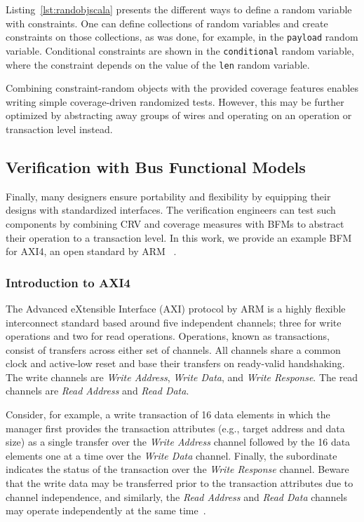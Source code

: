 \documentclass[conference]{IEEEtran}
\begin{document}
Listing~\ref{lst:randobjscala} presents the different ways to define a random variable with constraints.
One can define collections of random variables and create constraints on those collections, as was done, for example, in the \texttt{payload} random variable. 
Conditional constraints are shown in the \texttt{conditional} random variable, where the constraint depends on the value of the \texttt{len} random variable. 

Combining constraint-random objects with the provided coverage features enables writing simple coverage-driven randomized tests. 
However, this may be further optimized by abstracting away groups of wires and operating on an operation or transaction level instead.

\subsection{Verification with Bus Functional Models}
Finally, many designers ensure portability and flexibility by equipping their designs with standardized interfaces. 
The verification engineers can test such components by combining CRV and coverage measures with BFMs to abstract their 
operation to a transaction level. In this work, we provide an example BFM for AXI4, an open standard by ARM~
\cite{axi4standard}.

\subsubsection{Introduction to AXI4}
The Advanced eXtensible Interface (AXI) protocol by ARM is a highly flexible interconnect standard based around five independent channels; three for write operations and two for read operations. Operations, known as transactions, consist of transfers across either set of channels. All channels share a common clock and active-low reset and base their transfers on ready-valid handshaking. The write channels are \textit{Write Address}, \textit{Write Data}, and \textit{Write Response}. The read channels are \textit{Read Address} and \textit{Read Data}.

Consider, for example, a write transaction of 16 data elements in which the manager first provides the transaction attributes (e.g., target address and data size) as a single transfer over the \textit{Write Address} channel followed by the 16 data elements one at a time over the \textit{Write Data} channel. Finally, the subordinate indicates the status of the transaction over the \textit{Write Response} channel. Beware that the write data may be transferred prior to the transaction attributes due to channel independence, and similarly, the \textit{Read Address} and \textit{Read Data} channels may operate independently at the same time~\cite{axi4standard}.
\end{document}

